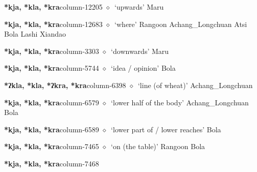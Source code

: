   \item {\footnotesize \textbf{*kja, *kla, *kra}}{\tiny column-12205}
         $\diamond$~`upwards'
         Maru 
  \item {\footnotesize \textbf{*kja, *kla, *kra}}{\tiny column-12683}
         $\diamond$~`where'
         Rangoon 
\hspace{1ex}
         Achang\_Longchuan 
\hspace{1ex}
         Atsi 
\hspace{1ex}
         Bola 
\hspace{1ex}
         Lashi 
\hspace{1ex}
         Xiandao 
  \item {\footnotesize \textbf{*kja, *kla, *kra}}{\tiny column-3303}
         $\diamond$~`downwards'
         Maru 
  \item {\footnotesize \textbf{*kja, *kla, *kra}}{\tiny column-5744}
         $\diamond$~`idea / opinion'
         Bola 
  \item {\footnotesize \textbf{*ʔkla, *kla, *ʔkra, *kra}}{\tiny column-6398}
         $\diamond$~`line (of wheat)'
         Achang\_Longchuan 
  \item {\footnotesize \textbf{*kja, *kla, *kra}}{\tiny column-6579}
         $\diamond$~`lower half of the body'
         Achang\_Longchuan 
\hspace{1ex}
         Bola 
  \item {\footnotesize \textbf{*kja, *kla, *kra}}{\tiny column-6589}
         $\diamond$~`lower part of / lower reaches'
         Bola 
  \item {\footnotesize \textbf{*kja, *kla, *kra}}{\tiny column-7465}
         $\diamond$~`on (the table)'
         Rangoon 
\hspace{1ex}
         Bola 
  \item {\footnotesize \textbf{*kja, *kla, *kra}}{\tiny column-7468}
